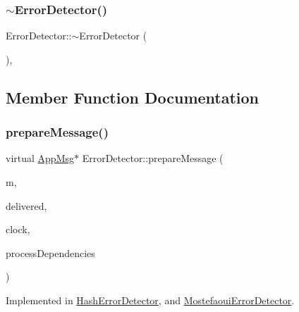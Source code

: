 \subsubsection{\texorpdfstring{$\sim$\+Error\+Detector()}{~ErrorDetector()}}
{\footnotesize\ttfamily Error\+Detector\+::$\sim$\+Error\+Detector (\begin{DoxyParamCaption}{ }\end{DoxyParamCaption})\hspace{0.3cm}{\ttfamily [pure virtual]}, {\ttfamily [default]}}



\subsection{Member Function Documentation}
\mbox{\label{classErrorDetector_a8cac1f6ac6803da4379df7891789c490}} 
\subsubsection{\texorpdfstring{prepare\+Message()}{prepareMessage()}}
{\footnotesize\ttfamily virtual \hyperlink{classAppMsg}{App\+Msg}$\ast$ Error\+Detector\+::prepare\+Message (\begin{DoxyParamCaption}\item[{\hyperlink{classAppMsg}{App\+Msg} $\ast$}]{m,  }\item[{const vector$<$ \hyperlink{structures_8h_a7e7bdc1d2fff8a9436f2f352b2711ed6}{message\+Info} $>$ \&}]{delivered,  }\item[{const \hyperlink{classProbabilisticClock}{Probabilistic\+Clock} \&}]{clock,  }\item[{const \hyperlink{classTotalDependencies}{Total\+Dependencies} \&}]{process\+Dependencies }\end{DoxyParamCaption})\hspace{0.3cm}{\ttfamily [pure virtual]}}



Implemented in \hyperlink{classHashErrorDetector_a2b1dad6a83a08fd7ce88e32f84638459}{Hash\+Error\+Detector}, and \hyperlink{classMostefaouiErrorDetector_adcd530d7349df19adb614ca414225214}{Mostefaoui\+Error\+Detector}.

\mbox{\label{classErrorDetector_afc717d04768dd207196c08e24163115c}} 
